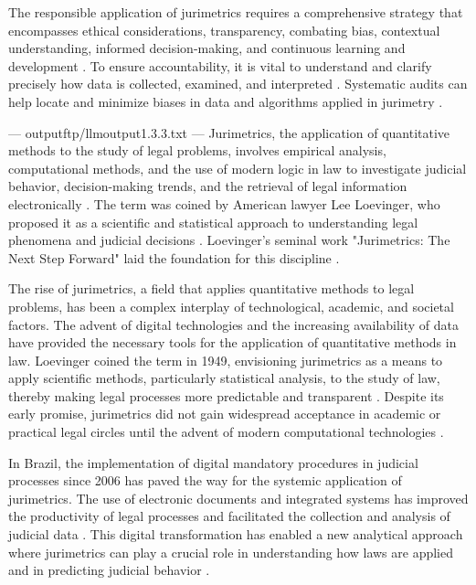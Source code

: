 The responsible application of jurimetrics requires a comprehensive strategy that encompasses ethical considerations, transparency, combating bias, contextual understanding, informed decision-making, and continuous learning and development \cite{10.1590/dados.2022.65.3.267,in the lawviewmetadatacitationsimilarpapers2014}. To ensure accountability, it is vital to understand and clarify precisely how data is collected, examined, and interpreted \cite{10.1590/dados.2022.65.3.267,in the lawviewmetadatacitationsimilarpapers2014}. Systematic audits can help locate and minimize biases in data and algorithms applied in jurimetry \cite{10.1590/dados.2022.65.3.267,in the lawviewmetadatacitationsimilarpapers2014}.


---
outputftp/llmoutput1.3.3.txt
---
Jurimetrics, the application of quantitative methods to the study of legal problems, involves empirical analysis, computational methods, and the use of modern logic in law to investigate judicial behavior, decision-making trends, and the retrieval of legal information electronically \cite{loevinger1949, nunes2018, de2010}. The term was coined by American lawyer Lee Loevinger, who proposed it as a scientific and statistical approach to understanding legal phenomena and judicial decisions \cite{nunes2018, luvizotto2020}. Loevinger's seminal work "Jurimetrics: The Next Step Forward" laid the foundation for this discipline \cite{nunes2018, zabala2019}.

The rise of jurimetrics, a field that applies quantitative methods to legal problems, has been a complex interplay of technological, academic, and societal factors. The advent of digital technologies and the increasing availability of data have provided the necessary tools for the application of quantitative methods in law. Loevinger coined the term in 1949, envisioning jurimetrics as a means to apply scientific methods, particularly statistical analysis, to the study of law, thereby making legal processes more predictable and transparent \cite{103390fi9040068, zabala2019d}. Despite its early promise, jurimetrics did not gain widespread acceptance in academic or practical legal circles until the advent of modern computational technologies \cite{l2010de}.

In Brazil, the implementation of digital mandatory procedures in judicial processes since 2006 has paved the way for the systemic application of jurimetrics. The use of electronic documents and integrated systems has improved the productivity of legal processes and facilitated the collection and analysis of judicial data \cite{103390fi9040068}. This digital transformation has enabled a new analytical approach where jurimetrics can play a crucial role in understanding how laws are applied and in predicting judicial behavior \cite{103390fi9040068}.

